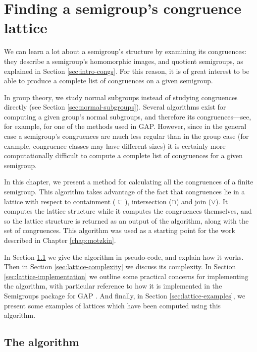 \chapter{Finding a semigroup's congruence lattice}
\label{chap:lattice}

We can learn a lot about a semigroup's structure by examining its congruences:
they describe a semigroup's homomorphic images, and quotient semigroups, as
explained in Section \ref{sec:intro-congs}.  For this reason, it is of great
interest to be able to produce a complete list of congruences on a given
semigroup.

In group theory, we study normal subgroups instead of studying congruences
directly (see Section \ref{sec:normal-subgroups}).  Several algorithms exist for
computing a given group's normal subgroups, and therefore its congruences---see,
for example, \cite{hulpke_1998} for one of the methods used in GAP.  However,
since in the general case a semigroup's congruences are much less regular than
in the group case (for example, congruence classes may have different sizes) it
is certainly more computationally difficult to compute a complete list of
congruences for a given semigroup.

In this chapter, we present a method for calculating all the congruences of a
finite semigroup.  This algorithm takes advantage of the fact that congruences
lie in a lattice with respect to containment ($\subseteq$), intersection
($\cap$) and join ($\vee$).  It computes the lattice structure while it computes
the congruences themselves, and so the lattice structure is returned as an
output of the algorithm, along with the set of congruences.  This algorithm was
used as a starting point for the work described in Chapter \ref{chap:motzkin}.

In Section \ref{sec:lattice-algorithm} we give the algorithm in pseudo-code, and
explain how it works.  Then in Section \ref{sec:lattice-complexity} we discuss
its complexity.  In Section \ref{sec:lattice-implementation} we outline some
practical concerns for implementing the algorithm, with particular reference to
how it is implemented in the Semigroups package \cite{semigroups} for GAP
\cite{gap}.  And finally, in Section \ref{sec:lattice-examples}, we present some
examples of lattices which have been computed using this algorithm.

\section{The algorithm}
\label{sec:lattice-algorithm}

